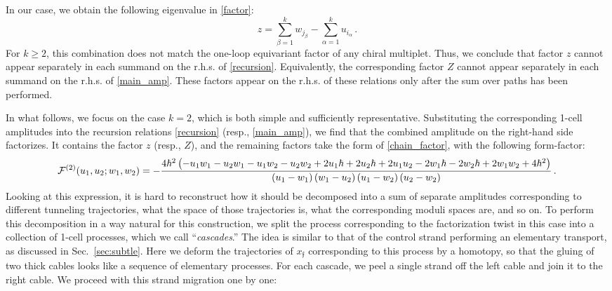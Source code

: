 \documentclass[10pt]{article}
\theoremstyle{definition}
\def\CF {{\cal F}}
\def\ff{\mathfrak{f}}
\def\lm{\limits}
\numberwithin{equation}{section}
\begin{document}
In our case, we obtain the following eigenvalue in \eqref{factor}:
\begin{equation}
	z=\sum\lm_{\beta=1}^k w_{j_\beta}-\sum\lm_{\alpha=1}^k u_{i_\alpha}\,.
\end{equation}
For $k\geq 2$, this combination does not match the one-loop equivariant factor of any chiral multiplet.
Thus, we conclude that factor $z$ cannot appear separately in each summand on the r.h.s. of \eqref{recursion}.
Equivalently, the corresponding factor $Z$ cannot appear separately in each summand on the r.h.s. of \eqref{main_amp}.
These factors appear on the r.h.s. of these relations only after the sum over paths has been performed.

In what follows, we focus on the case $k=2$, which is both simple and sufficiently representative.
Substituting the corresponding 1-cell amplitudes into the recursion relations \eqref{recursion} (resp., \eqref{main_amp}), we find that the combined amplitude on the right-hand side factorizes.
It contains the factor $z$ (resp., $Z$), and the remaining factors take the form of \eqref{chain_factor}, with the following form-factor:
\begin{equation}
	\CF^{(2)}(u_1,u_2;w_1,w_2)=-\frac{4 \hbar ^2 \left(-u_1 w_1-u_2 w_1-u_1 w_2-u_2 w_2+2 u_1 \hbar +2 u_2 \hbar +2 u_1 u_2-2 w_1 \hbar -2 w_2 \hbar +2 w_1 w_2+4 \hbar ^2\right)}{\left(u_1-w_1\right) \left(w_1-u_2\right) \left(u_1-w_2\right) \left(u_2-w_2\right)}\,.
\end{equation}
Looking at this expression, it is hard to reconstruct how it should be decomposed into a sum of separate amplitudes corresponding to different tunneling trajectories, what the space of those trajectories is, what the corresponding moduli spaces are, and so on.
To perform this decomposition in a way natural for this construction, we split the process corresponding to the factorization twist in this case into a collection of 1-cell processes, which we call ``\emph{cascades}.''
The idea is similar to that of the control strand performing an elementary transport, as discussed in Sec.~\ref{sec:subtle}.
Here we deform the trajectories of $x_{\ff}$ corresponding to this process by a homotopy, so that the gluing of two thick cables looks like a sequence of elementary processes.
For each cascade, we peel a single strand off the left cable and join it to the right cable.
We proceed with this strand migration one by one:
\end{document}
